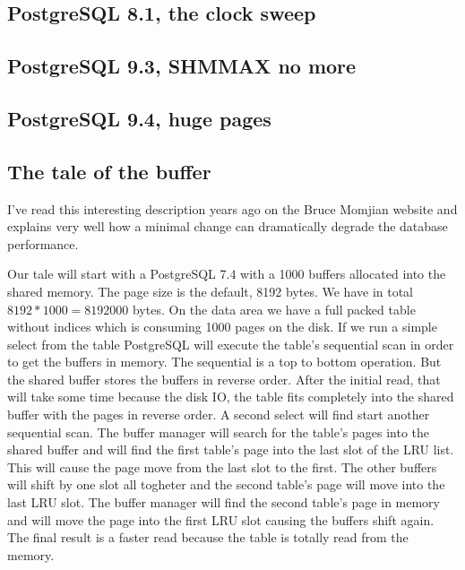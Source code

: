 \subsection{PostgreSQL 8.1, the clock sweep}

\subsection{PostgreSQL 9.3, SHMMAX no more}

\subsection{PostgreSQL 9.4, huge pages}

\subsection{The tale of the buffer}
I've read this interesting description years ago on the Bruce Momjian website and explains very well how a 
minimal change can dramatically degrade the database performance.\newline

Our tale will start with a PostgreSQL 7.4 with a 1000 buffers allocated into the shared memory. The page 
size is the default, 8192 bytes. We have in total \begin{math}8192 * 1000 = 8192000\end{math} bytes. On the 
data area we have a full packed table without indices which is consuming 1000 pages on the disk. If we run 
a simple select from the table PostgreSQL  will execute the table's sequential scan in order to get the 
buffers in memory. The sequential is a top to bottom operation. But the shared buffer stores the buffers in 
reverse order. After the initial read, that will take some time because the disk IO, the table fits 
completely into the shared buffer with the pages in reverse order. A second select will find start another 
sequential scan. The buffer manager will search for the table's pages into the shared buffer and will find 
the first table's page into the last slot of the LRU list. This will cause the page move from the last slot 
to the first. The other buffers will shift by one slot all togheter and the second table's page will move 
into the last LRU slot. The buffer manager will find the second table's page in memory and will move the 
page into the first LRU slot causing the buffers shift again. The final result is a faster read because the 
table is totally read from the memory.\newline

